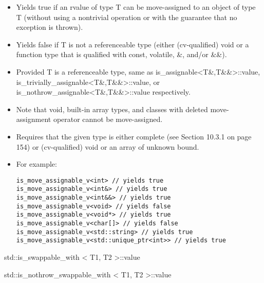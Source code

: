 \begin{itemize}
\item
Yields true if an rvalue of type T can be move-assigned to an object of type T (without using a nontrivial operation or with the guarantee that no exception is thrown).

\item
Yields false if T is not a referenceable type (either (cv-qualified) void or a function type that is qualified with const, volatile, \&, and/or \&\&).

\item
Provided T is a referenceable type, same as is\_assignable<T\&,T\&\&>::value, is\_trivially\_assignable<T\&,T\&\&>::value, or is\_nothrow\_assignable<T\&,T\&\&>::value respectively.

\item
Note that void, built-in array types, and classes with deleted move-assignment operator cannot be move-assigned.

\item
Requires that the given type is either complete (see Section 10.3.1 on page 154) or (cv-qualified) void or an array of unknown bound.

\item
For example:
\begin{lstlisting}[style=styleCXX]
is_move_assignable_v<int> // yields true
is_move_assignable_v<int&> // yields true
is_move_assignable_v<int&&> // yields true
is_move_assignable_v<void> // yields false
is_move_assignable_v<void*> // yields true
is_move_assignable_v<char[]> // yields false
is_move_assignable_v<std::string> // yields true
is_move_assignable_v<std::unique_ptr<int>> // yields true
\end{lstlisting}
\end{itemize}


std::is\_swappable\_with < T1, T2 >::value

std::is\_nothrow\_swappable\_with < T1, T2 >::value

